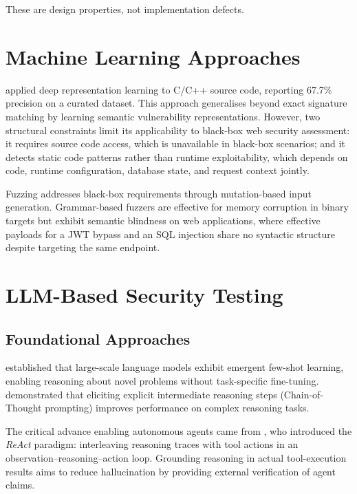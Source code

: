 \documentclass[12pt, a4paper, oneside, openany]{book}
\begin{document}
These are design properties, not implementation defects.

\section{Machine Learning Approaches}
\label{sec:ml}

\citet{russell2018automated} applied deep representation learning to
C/C++ source code, reporting 67.7\% precision on a curated dataset.
This approach generalises beyond exact signature matching by learning
semantic vulnerability representations.  However, two structural
constraints limit its applicability to black-box web security
assessment: it requires source code access, which is unavailable in
black-box scenarios; and it detects static code patterns rather than
runtime exploitability, which depends on code, runtime configuration,
database state, and request context jointly.

Fuzzing \citep{sutton2007fuzzing} addresses black-box requirements
through mutation-based input generation.  Grammar-based fuzzers are
effective for memory corruption in binary targets but exhibit semantic
blindness on web applications, where effective payloads for a JWT
bypass and an SQL injection share no syntactic structure despite
targeting the same endpoint.

\section{LLM-Based Security Testing}
\label{sec:llm}

\subsection{Foundational Approaches}

\citet{brown2020gpt3} established that large-scale language models
exhibit emergent few-shot learning, enabling reasoning about novel
problems without task-specific fine-tuning.
\citet{wei2022chain} demonstrated that eliciting explicit intermediate
reasoning steps (Chain-of-Thought prompting) improves performance on
complex reasoning tasks.

The critical advance enabling autonomous agents came from
\citet{yao2023react}, who introduced the \textit{ReAct} paradigm:
interleaving reasoning traces with tool actions in an
observation--reasoning--action loop.  Grounding reasoning in actual
tool-execution results aims to reduce hallucination by providing
external verification of agent claims.
\end{document}
